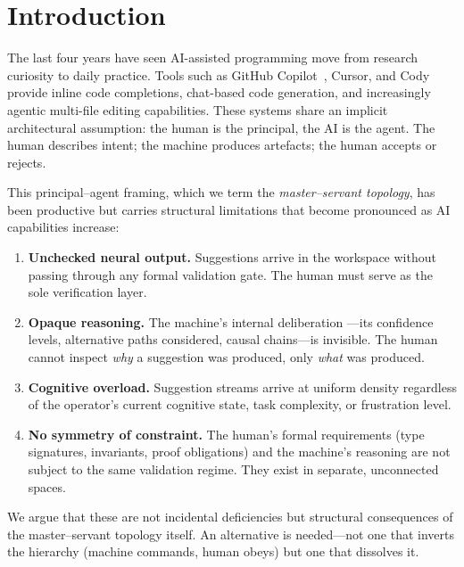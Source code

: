 \documentclass[11pt,a4paper]{article}
\begin{document}
\section{Introduction}\label{sec:intro}

The last four years have seen AI-assisted programming move from
research curiosity to daily practice. Tools such as GitHub
Copilot~\citep{chen2021evaluating}, Cursor, and Cody provide
inline code completions, chat-based code generation, and
increasingly agentic multi-file editing capabilities. These systems
share an implicit architectural assumption: the human is the
principal, the AI is the agent. The human describes intent; the
machine produces artefacts; the human accepts or rejects.

This principal--agent framing, which we term the \textit{master--servant
topology}, has been productive but carries structural limitations
that become pronounced as AI capabilities increase:

\begin{enumerate}[label=(\roman*)]
  \item \textbf{Unchecked neural output.} Suggestions arrive in the
    workspace without passing through any formal validation gate. The
    human must serve as the sole verification layer.
  \item \textbf{Opaque reasoning.} The machine's internal deliberation
    ---its confidence levels, alternative paths considered, causal
    chains---is invisible. The human cannot inspect \textit{why} a
    suggestion was produced, only \textit{what} was produced.
  \item \textbf{Cognitive overload.} Suggestion streams arrive at
    uniform density regardless of the operator's current cognitive
    state, task complexity, or frustration level.
  \item \textbf{No symmetry of constraint.} The human's formal
    requirements (type signatures, invariants, proof obligations) and
    the machine's reasoning are not subject to the same validation
    regime. They exist in separate, unconnected spaces.
\end{enumerate}

We argue that these are not incidental deficiencies but structural
consequences of the master--servant topology itself. An alternative
is needed---not one that inverts the hierarchy (machine commands,
human obeys) but one that dissolves it.
\end{document}
